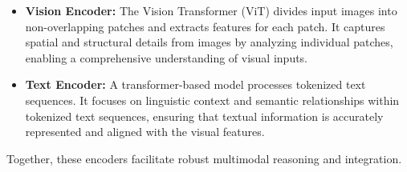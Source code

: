 \begin{itemize}
    \item \textbf{Vision Encoder:} The Vision Transformer (ViT) divides input images into non-overlapping patches and extracts features for each patch. It captures spatial and structural details from images by analyzing individual patches, enabling a comprehensive understanding of visual inputs.
    \item \textbf{Text Encoder:} A transformer-based model processes tokenized text sequences. It focuses on linguistic context and semantic relationships within tokenized text sequences, ensuring that textual information is accurately represented and aligned with the visual features.
\end{itemize}

Together, these encoders facilitate robust multimodal reasoning and integration.






